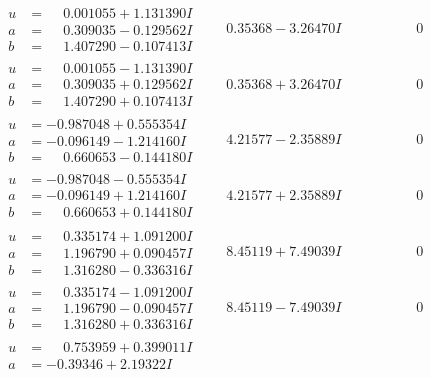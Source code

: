 \documentclass[1p]{elsarticle_modified}
\theoremstyle{definition}
\begin{document}
$$\begin{array}{c|c|c}
\begin{aligned}
u &= \phantom{-}0.001055 + 1.131390 I \\
a &= \phantom{-}0.309035 - 0.129562 I \\
b &= \phantom{-}1.407290 - 0.107413 I\end{aligned}
 & \phantom{-}0.35368 - 3.26470 I & \phantom{-0.000000 } 0 \\ \hline\begin{aligned}
u &= \phantom{-}0.001055 - 1.131390 I \\
a &= \phantom{-}0.309035 + 0.129562 I \\
b &= \phantom{-}1.407290 + 0.107413 I\end{aligned}
 & \phantom{-}0.35368 + 3.26470 I & \phantom{-0.000000 } 0 \\ \hline\begin{aligned}
u &= -0.987048 + 0.555354 I \\
a &= -0.096149 - 1.214160 I \\
b &= \phantom{-}0.660653 - 0.144180 I\end{aligned}
 & \phantom{-}4.21577 - 2.35889 I & \phantom{-0.000000 } 0 \\ \hline\begin{aligned}
u &= -0.987048 - 0.555354 I \\
a &= -0.096149 + 1.214160 I \\
b &= \phantom{-}0.660653 + 0.144180 I\end{aligned}
 & \phantom{-}4.21577 + 2.35889 I & \phantom{-0.000000 } 0 \\ \hline\begin{aligned}
u &= \phantom{-}0.335174 + 1.091200 I \\
a &= \phantom{-}1.196790 + 0.090457 I \\
b &= \phantom{-}1.316280 - 0.336316 I\end{aligned}
 & \phantom{-}8.45119 + 7.49039 I & \phantom{-0.000000 } 0 \\ \hline\begin{aligned}
u &= \phantom{-}0.335174 - 1.091200 I \\
a &= \phantom{-}1.196790 - 0.090457 I \\
b &= \phantom{-}1.316280 + 0.336316 I\end{aligned}
 & \phantom{-}8.45119 - 7.49039 I & \phantom{-0.000000 } 0 \\ \hline\begin{aligned}
u &= \phantom{-}0.753959 + 0.399011 I \\
a &= -0.39346 + 2.19322 I \\

\end{aligned}
\end{array}$$
\end{document}

